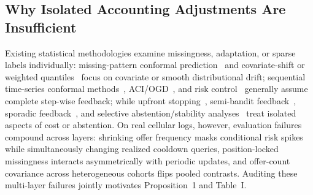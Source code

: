 \subsection{Why Isolated Accounting Adjustments Are Insufficient}
\label{sec:related_gap}
Existing statistical methodologies examine missingness, adaptation, or sparse labels individually: missing-pattern conformal prediction~\cite{zaffran2023} and covariate-shift or weighted quantiles~\cite{tibshirani2019,barber2023} focus on covariate or smooth distributional drift; sequential time-series conformal methods~\cite{zaffran2022,xu2023,lin2022,gibbs2024}, ACI/OGD~\cite{gibbs2021,bhatnagar2023,pid2023,angelopoulos2024online,podkopaev2024}, and risk control~\cite{bates2021,angelopoulos2024risk,angelopoulos2021ltt,gibbs2025,gauthier2026} generally assume complete step-wise feedback; while upfront stopping~\cite{ilyas2026}, semi-bandit feedback~\cite{ge2025}, sporadic feedback~\cite{hou2025}, and selective abstention/stability analyses~\cite{geifman2017,min2026} treat isolated aspects of cost or abstention. On real cellular logs, however, evaluation failures compound across layers: shrinking offer frequency masks conditional risk spikes while simultaneously changing realized cooldown queries, position-locked missingness interacts asymmetrically with periodic updates, and offer-count covariance across heterogeneous cohorts flips pooled contrasts. Auditing these multi-layer failures jointly motivates Proposition~1 and Table~I.

